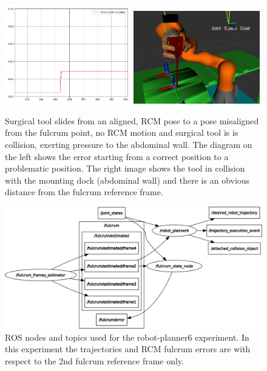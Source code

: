 \begin{center}
\begin{figure}[!htb]
\centering
\includegraphics[width=0.49\textwidth]{images/robot_planner6/rcm-error-collision.png}
\includegraphics[width=0.49\textwidth]{images/robot_planner6/rcm-collision.png}\\
\caption{Surgical tool slides from an aligned, RCM pose to a pose misaligned from the fulcrum point, no RCM motion and surgical tool is is collision, exerting pressure to the abdominal wall. The diagram on the 
left shows the error starting from a correct position to a problematic position. The right image shows the tool in collision with the mounting dock (abdominal wall) and there is an obvious distance from the 
fulcrum reference frame.}
\end{figure}
\end{center}

\begin{center}
\begin{figure}[!htb]
\centering
\includegraphics[width=\textwidth]{images/robot_planner6/topics-and-nodes.png}
\caption{ROS nodes and topics used for the robot-planner6 experiment. In this experiment the trajectories and RCM fulcrum errors are with respect to the 2nd fulcrum reference frame only.}
\end{figure}
\end{center}


